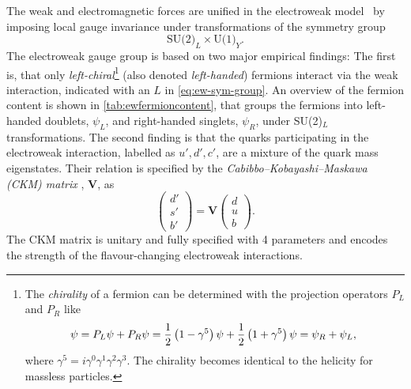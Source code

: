 The weak and electromagnetic forces are unified in the electroweak model~\cite{GLASHOW1961579,SALAM1964168,PhysRevLett.19.1264} by imposing local gauge invariance under transformations of the symmetry group
\begin{equation}
  \label{eq:ew-sym-group}
  \text{SU(2)}_L \times \text{U(1)}_Y.
\end{equation}
The electroweak gauge group is based on two major empirical findings:
The first is, that only \emph{left-chiral}\footnote{
  The \emph{chirality} of a fermion can be determined with the projection operators $P_L$ and $P_R$ like
  \begin{equation*}
    \psi       = P_L \psi + P_R \psi = \frac{1}{2} \left( 1 - \gamma^5 \right) \psi + \frac{1}{2} \left( 1 + \gamma^5 \right) \psi = \psi_R + \psi_L,                                \\
  \end{equation*}
  where $\gamma^5 = i\gamma^0\gamma^1\gamma^2\gamma^3$. The chirality becomes identical to the helicity for massless particles.
} (also denoted \emph{left-handed}) fermions interact via the weak interaction, indicated with an $L$ in \cref{eq:ew-sym-group}. An overview of the fermion content is shown in \cref{tab:ewfermioncontent}, that groups the fermions into left-handed doublets, $\psi_L$, and right-handed singlets, $\psi_R$, under SU(2)$_L$ transformations. 
The second finding is that the quarks participating in the electroweak interaction, labelled as $u', d', c'$, are a mixture of the quark mass eigenstates. Their relation is specified by the \emph{Cabibbo–Kobayashi–Maskawa (CKM) matrix} \cite{doi:10.1143/PTP.49.652}, $\pmb{V}$, as
\begin{equation}
  \begin{pmatrix}
   d' \\
   s' \\
   b'
 \end{pmatrix}
 = 
 \pmb{V} 
 \begin{pmatrix}
   d \\
   u \\
   b
 \end{pmatrix}.
\end{equation}
The CKM matrix is unitary and fully specified with 4 parameters and encodes the strength of the flavour-changing electroweak interactions.

